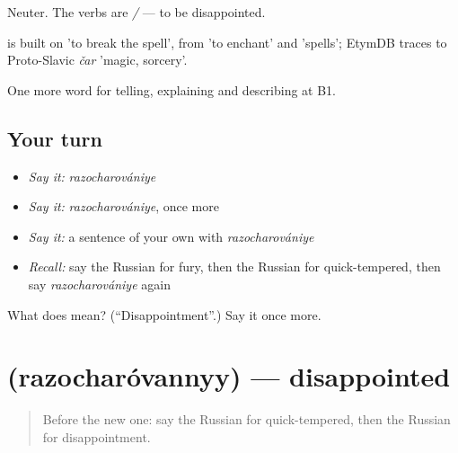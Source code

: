 Neuter. The verbs are \emph{ / } — to be disappointed.

\begin{cousinweb}
\emph{} is built on \emph{} 'to break the spell', from \emph{} 'to enchant' and \emph{} 'spells'; EtymDB traces \emph{} to Proto-Slavic \emph{čar} 'magic, sorcery'.
\end{cousinweb}

\begin{grammarlens}[title={What you've built}]
One more word for telling, explaining and describing at B1.
\end{grammarlens}

\subsection*{Your turn}
\begin{itemize}
\raggedright
  \item \emph{Say it:} \emph{razocharovániye}
  \item \emph{Say it:} \emph{razocharovániye}, once more
  \item \emph{Say it:} a sentence of your own with \emph{razocharovániye}
  \item \emph{Recall:} say the Russian for fury, then the Russian for quick-tempered, then say \emph{razocharovániye} again
\end{itemize}

\begin{tcolorbox}[breakable,colback=teal!4,colframe=teal!35!black,title={Before you move on}]
What does  mean? (\textquotedblleft{}Disappointment\textquotedblright{}.) Say it once more.
\end{tcolorbox}
\section[\texorpdfstring{\ru{разочарованный} (razocharóvannyy)}{разочарованный (razocharóvannyy)}]{ (razocharóvannyy) — disappointed}

\label{lesson:RU-C473-razocharovannyy}



\begin{quote}
Before the new one: say the Russian for quick-tempered, then the Russian for disappointment.
\end{quote}

